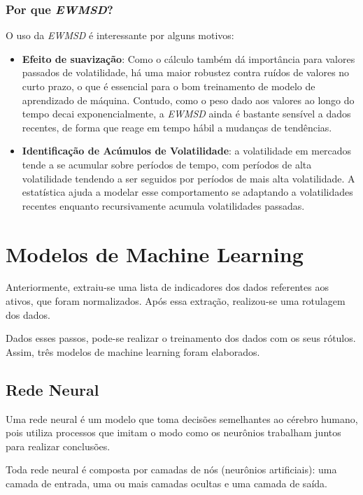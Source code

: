 \documentclass{article}
\begin{document}
\subsubsection{Por que \textit{EWMSD}?}

\cite{Knight} O uso da \textit{EWMSD} é interessante por alguns motivos:

\begin{itemize}
    \item \textbf{Efeito de suavização}: Como o cálculo também dá importância para valores passados de volatilidade, há uma maior robustez contra ruídos de valores no curto prazo, o que é essencial para o bom treinamento de modelo de aprendizado de máquina. Contudo, como o peso dado aos valores ao longo do tempo decai exponencialmente, a \textit{EWMSD} ainda é bastante sensível a dados recentes, de forma que  reage em tempo hábil a mudanças de tendências.
    
    \item \textbf{Identificação de Acúmulos de Volatilidade}: a volatilidade em mercados tende a se acumular sobre períodos de tempo, com períodos de alta volatilidade tendendo a ser seguidos por períodos de mais alta volatilidade. A estatística ajuda a modelar esse comportamento se adaptando a volatilidades recentes enquanto recursivamente acumula volatilidades passadas.
\end{itemize}

\newpage

\section{Modelos de Machine Learning}

Anteriormente, extraiu-se uma lista de indicadores dos dados referentes aos ativos, que foram normalizados. Após essa extração, realizou-se uma rotulagem dos dados. 

Dados esses passos, pode-se realizar o treinamento dos dados com os seus rótulos. Assim, três modelos de machine learning foram elaborados.

\subsection{Rede Neural}

Uma rede neural é um modelo que toma decisões semelhantes ao cérebro humano, pois utiliza processos que imitam o modo como os neurônios trabalham juntos para realizar conclusões.

Toda rede neural é composta por camadas de nós (neurônios artificiais): uma camada de entrada, uma ou mais camadas ocultas e uma camada de saída.
\end{document}
